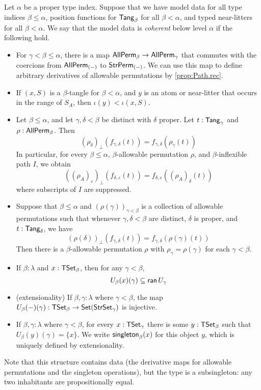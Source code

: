 \begin{definition}
  \label{def:CoherentData}
  Let \( \alpha \) be a proper type index.
  Suppose that we have model data for all type indices \( \beta \leq \alpha \), position functions for \( \mathsf{Tang}_\beta \) for all \( \beta < \alpha \), and typed near-litters for all \( \beta < \alpha \).
  We say that the model data is \emph{coherent} below level \( \alpha \) if the following hold.
  \begin{itemize}
    \item For \( \gamma < \beta \leq \alpha \), there is a map \( \mathsf{AllPerm}_\beta \to \mathsf{AllPerm}_\gamma \) that commutes with the coercions from \( \mathsf{AllPerm}_{(-)} \) to \( \mathsf{StrPerm}_{(-)} \).
    We can use this map to define arbitrary derivatives of allowable permutations by \cref{prop:Path.rec}.
    \item If \( (x, S) \) is a \( \beta \)-tangle for \( \beta < \alpha \), and \( y \) is an atom or near-litter that occurs in the range of \( S_A \), then \( \iota(y) < \iota(x, S) \).
    \item Let \( \beta \leq \alpha \), and let \( \gamma, \delta < \beta \) be distinct with \( \delta \) proper.
    Let \( t : \mathsf{Tang}_\gamma \) and \( \rho : \mathsf{AllPerm}_\beta \).
    Then
    \[ (\rho_\delta)_\bot(f_{\gamma,\delta}(t)) = f_{\gamma,\delta}(\rho_\gamma(t)) \]
    In particular, for every \( \beta \leq \alpha \), \( \beta \)-allowable permutation \( \rho \), and \( \beta \)-inflexible path \( I \), we obtain
    \[ ((\rho_A)_\varepsilon)_\bot(f_{\delta,\varepsilon}(t)) = f_{\delta,\varepsilon}((\rho_A)_\delta(t)) \]
    where subscripts of \( I \) are suppressed.
    \item Suppose that \( \beta \leq \alpha \) and \( (\rho(\gamma))_{\gamma < \beta} \) is a collection of allowable permutations such that whenever \( \gamma, \delta < \beta \) are distinct, \( \delta \) is proper, and \( t : \mathsf{Tang}_\delta \), we have
    \[ (\rho(\delta))_\bot(f_{\gamma,\delta}(t)) = f_{\gamma,\delta}(\rho(\gamma)(t)) \]
    Then there is a \( \beta \)-allowable permutation \( \rho \) with \( \rho_\gamma = \rho(\gamma) \) for each \( \gamma < \beta \).
    \item If \( \beta : \lambda \) and \( x : \mathsf{TSet}_\beta \), then for any \( \gamma < \beta \),
    \[ U_\beta(x)(\gamma) \subseteq \operatorname{\mathsf{ran}} U_\gamma \]
    \item (extensionality) If \( \beta, \gamma : \lambda \) where \( \gamma < \beta \), the map \( U_\beta(-)(\gamma) : \mathsf{TSet}_\beta \to \operatorname{\mathsf{Set}} (\mathsf{StrSet}_\gamma) \) is injective.
    \item If \( \beta, \gamma : \lambda \) where \( \gamma < \beta \), for every \( x : \mathsf{TSet}_\gamma \) there is some \( y : \mathsf{TSet}_\beta \) such that \( U_\beta(y)(\gamma) = \{ x \} \).
    We write \( \operatorname{\mathsf{singleton}}_\beta(x) \) for this object \( y \), which is uniquely defined by extensionality.
  \end{itemize}
  Note that this structure contains data (the derivative maps for allowable permutations and the singleton operations), but the type is a subsingleton: any two inhabitants are propositionally equal.
\end{definition}

